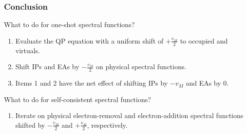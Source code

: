 \begin{frame}
\frametitle{Conclusion}
What to do for one-shot spectral functions? 
\begin{enumerate}
    \item Evaluate the QP equation with a uniform shift of $+\frac{v_M}{2}$ to occupied and virtuals. \pause
    \item Shift IPs and EAs by $-\frac{v_M}{2}$ on physical spectral functions. \pause
    \item Items 1 and 2 have the net effect of shifting IPs by $-v_M$ and EAs by $0$. \pause
\end{enumerate}
What to do for self-consistent spectral functions? 
\begin{enumerate}
    \item Iterate on physical electron-removal and electron-addition spectral functions shifted by $-\frac{v_M}{2}$ and $+\frac{v_M}{2}$, respectively.
    \end{enumerate}
\end{frame}
